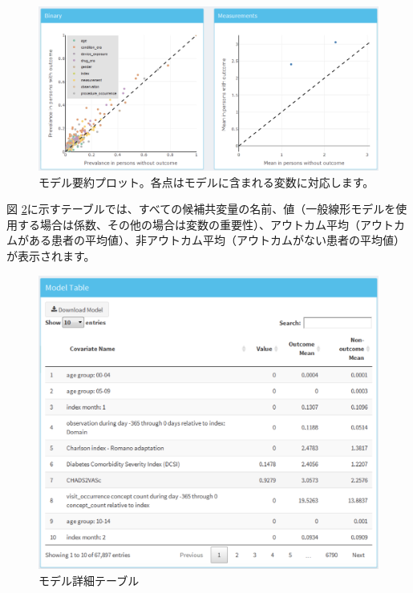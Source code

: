 \documentclass[
  11pt]{book}
\theoremstyle{definition}
\theoremstyle{definition}
\theoremstyle{definition}
\theoremstyle{definition}
\theoremstyle{remark}
\begin{document}
\begin{figure}

{\centering \includegraphics[width=1\linewidth]{images/PatientLevelPrediction/shiny/shinyModelPlots} 

}

\caption{モデル要約プロット。各点はモデルに含まれる変数に対応します。}\label{fig:shinyModelPlots}
\end{figure}

図 \ref{fig:shinyModelTable}に示すテーブルでは、すべての候補共変量の名前、値（一般線形モデルを使用する場合は係数、その他の場合は変数の重要性）、アウトカム平均（アウトカムがある患者の平均値）、非アウトカム平均（アウトカムがない患者の平均値）が表示されます。

\begin{figure}

{\centering \includegraphics[width=1\linewidth]{images/PatientLevelPrediction/shiny/shinyModelTable} 

}

\caption{モデル詳細テーブル}\label{fig:shinyModelTable}
\end{figure}
\end{document}
